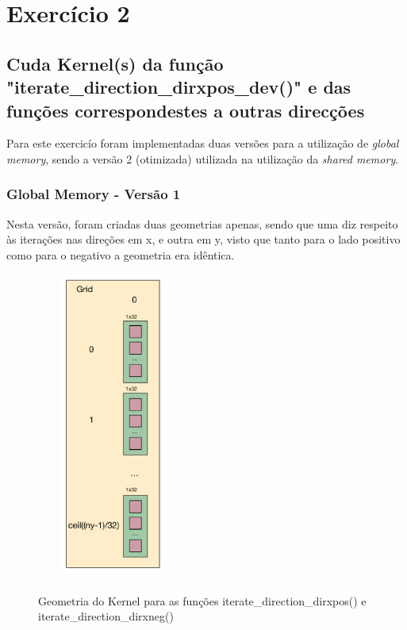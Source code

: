 \documentclass[pdftex,12pt,a4paper]{report}
\begin{document}
\newpage
\section{Exercício 2}

\subsection{Cuda Kernel(s) da função "iterate\_direction\_dirxpos\_dev()" e das funções correspondestes a outras direcções}

Para este exercicío foram implementadas duas versões para a utilização de \textit{global memory}, sendo a versão 2 (otimizada) utilizada na utilização da \textit{shared memory}.

\subsubsection{Global Memory - Versão 1}

Nesta versão, foram criadas duas geometrias apenas, sendo que uma diz respeito às iterações nas direções em x, e outra em y, visto que tanto para o lado positivo como para o negativo a geometria era idêntica.

 \begin{figure}[!htb]
\center
 \includegraphics[width=50mm,height=100mm,scale=1]{IteratePositionDirxposneg_v1_kernel.pdf}
 \caption{\\ Geometria do Kernel para as funções iterate\_direction\_dirxpos() e iterate\_direction\_dirxneg()}
 \label{fig:IteratePositionDirxposneg_v1_kernel}
\end{figure}
\end{document}
